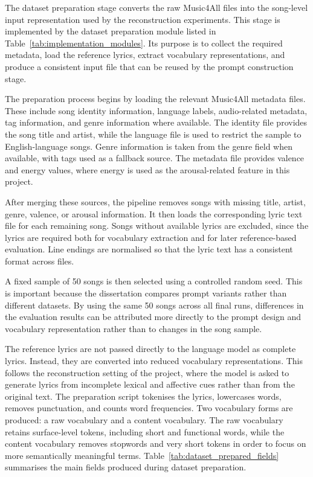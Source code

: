 The dataset preparation stage converts the raw Music4All files into the song-level input representation used by the reconstruction experiments. This stage is implemented by the dataset preparation module listed in Table~\ref{tab:implementation_modules}. Its purpose is to collect the required metadata, load the reference lyrics, extract vocabulary representations, and produce a consistent input file that can be reused by the prompt construction stage.

The preparation process begins by loading the relevant Music4All metadata files. These include song identity information, language labels, audio-related metadata, tag information, and genre information where available. The identity file provides the song title and artist, while the language file is used to restrict the sample to English-language songs. Genre information is taken from the genre field when available, with tags used as a fallback source. The metadata file provides valence and energy values, where energy is used as the arousal-related feature in this project.

After merging these sources, the pipeline removes songs with missing title, artist, genre, valence, or arousal information. It then loads the corresponding lyric text file for each remaining song. Songs without available lyrics are excluded, since the lyrics are required both for vocabulary extraction and for later reference-based evaluation. Line endings are normalised so that the lyric text has a consistent format across files.

A fixed sample of 50 songs is then selected using a controlled random seed. This is important because the dissertation compares prompt variants rather than different datasets. By using the same 50 songs across all final runs, differences in the evaluation results can be attributed more directly to the prompt design and vocabulary representation rather than to changes in the song sample.

The reference lyrics are not passed directly to the language model as complete lyrics. Instead, they are converted into reduced vocabulary representations. This follows the reconstruction setting of the project, where the model is asked to generate lyrics from incomplete lexical and affective cues rather than from the original text. The preparation script tokenises the lyrics, lowercases words, removes punctuation, and counts word frequencies. Two vocabulary forms are produced: a raw vocabulary and a content vocabulary. The raw vocabulary retains surface-level tokens, including short and functional words, while the content vocabulary removes stopwords and very short tokens in order to focus on more semantically meaningful terms. Table~\ref{tab:dataset_prepared_fields} summarises the main fields produced during dataset preparation.

